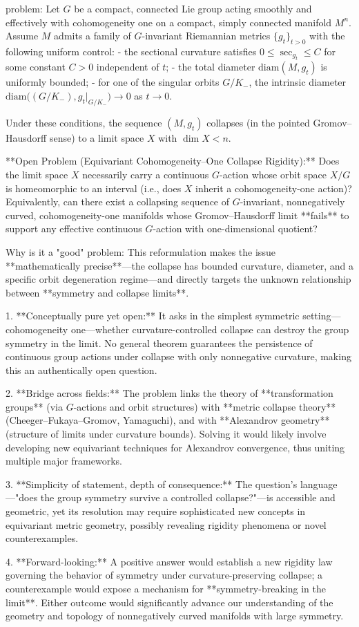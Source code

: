 problem:  
Let \(G\) be a compact, connected Lie group acting smoothly and effectively with cohomogeneity one on a compact, simply connected manifold \(M^n\).  
Assume \(M\) admits a family of \(G\)-invariant Riemannian metrics \(\{g_t\}_{t>0}\) with the following uniform control:  
- the sectional curvature satisfies \(0 \le \sec_{g_t} \le C\) for some constant \(C>0\) independent of \(t\);  
- the total diameter \(\mathrm{diam}(M,g_t)\) is uniformly bounded;  
- for one of the singular orbits \(G/K_-\), the intrinsic diameter \(\mathrm{diam}\big((G/K_-), g_t|_{G/K_-}\big) \to 0\) as \(t\to 0\).  

Under these conditions, the sequence \((M,g_t)\) collapses (in the pointed Gromov–Hausdorff sense) to a limit space \(X\) with \(\dim X < n\).

**Open Problem (Equivariant Cohomogeneity–One Collapse Rigidity):**  
Does the limit space \(X\) necessarily carry a continuous \(G\)-action whose orbit space \(X/G\) is homeomorphic to an interval (i.e., does \(X\) inherit a cohomogeneity-one action)?  
Equivalently, can there exist a collapsing sequence of \(G\)-invariant, nonnegatively curved, cohomogeneity-one manifolds whose Gromov–Hausdorff limit **fails** to support any effective continuous \(G\)-action with one-dimensional quotient?

Why is it a "good" problem:  
This reformulation makes the issue **mathematically precise**—the collapse has bounded curvature, diameter, and a specific orbit degeneration regime—and directly targets the unknown relationship between **symmetry and collapse limits**.  

1. **Conceptually pure yet open:**  
   It asks in the simplest symmetric setting—cohomogeneity one—whether curvature-controlled collapse can destroy the group symmetry in the limit.  No general theorem guarantees the persistence of continuous group actions under collapse with only nonnegative curvature, making this an authentically open question.  

2. **Bridge across fields:**  
   The problem links the theory of **transformation groups** (via \(G\)-actions and orbit structures) with **metric collapse theory** (Cheeger–Fukaya–Gromov, Yamaguchi), and with **Alexandrov geometry** (structure of limits under curvature bounds).  Solving it would likely involve developing new equivariant techniques for Alexandrov convergence, thus uniting multiple major frameworks.  

3. **Simplicity of statement, depth of consequence:**  
   The question’s language—"does the group symmetry survive a controlled collapse?"—is accessible and geometric, yet its resolution may require sophisticated new concepts in equivariant metric geometry, possibly revealing rigidity phenomena or novel counterexamples.  

4. **Forward-looking:**  
   A positive answer would establish a new rigidity law governing the behavior of symmetry under curvature-preserving collapse; a counterexample would expose a mechanism for **symmetry-breaking in the limit**.  Either outcome would significantly advance our understanding of the geometry and topology of nonnegatively curved manifolds with large symmetry.